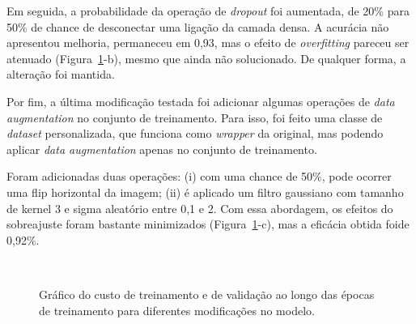 Em seguida, a probabilidade da operação de \textit{dropout} foi aumentada, de 20\% para 50\% de chance de desconectar uma ligação da camada densa. A acurácia não apresentou melhoria, permaneceu em 0,93, mas o efeito de \textit{overfitting} pareceu ser atenuado (Figura~\ref{fig:intro_conv:train}-b), mesmo que ainda não solucionado. De qualquer forma, a alteração foi mantida.

Por fim, a última modificação testada foi adicionar algumas operações de \textit{data augmentation} no conjunto de treinamento. Para isso, foi feito uma classe de \textit{dataset} personalizada, que funciona como \textit{wrapper} da original, mas podendo aplicar \textit{data augmentation} apenas no conjunto de treinamento.

Foram adicionadas duas operações: (i) com uma chance de 50\%, pode ocorrer uma flip horizontal da imagem; (ii) é aplicado um filtro gaussiano com tamanho de kernel 3 e sigma aleatório entre 0,1 e 2. Com essa abordagem, os efeitos do sobreajuste foram bastante minimizados (Figura~\ref{fig:intro_conv:train}-c), mas a eficácia obtida foide 0,92\%.



\begin{figure}[!htb]
	\centering
	 \\
	\caption{Gráfico do custo de treinamento e de validação ao longo das épocas de treinamento para diferentes modificações no modelo.}
	\label{fig:intro_conv:train}
\end{figure}